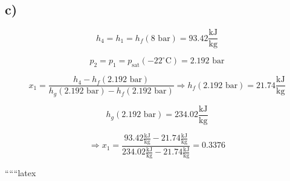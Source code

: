 

\subsection*{c)}

\[
h_4 = h_1 = h_f (8 \text{ bar}) = 93.42 \frac{\text{kJ}}{\text{kg}}
\]

\[
p_2 = p_1 = p_{\text{sat}} (-22^\circ \text{C}) = 2.192 \text{ bar}
\]

\[
x_1 = \frac{h_4 - h_f (2.192 \text{ bar})}{h_g (2.192 \text{ bar}) - h_f (2.192 \text{ bar})} \Rightarrow h_f (2.192 \text{ bar}) = 21.74 \frac{\text{kJ}}{\text{kg}}
\]

\[
h_g (2.192 \text{ bar}) = 234.02 \frac{\text{kJ}}{\text{kg}}
\]

\[
\Rightarrow x_1 = \frac{93.42 \frac{\text{kJ}}{\text{kg}} - 21.74 \frac{\text{kJ}}{\text{kg}}}{234.02 \frac{\text{kJ}}{\text{kg}} - 21.74 \frac{\text{kJ}}{\text{kg}}} = 0.3376
\]

``````latex